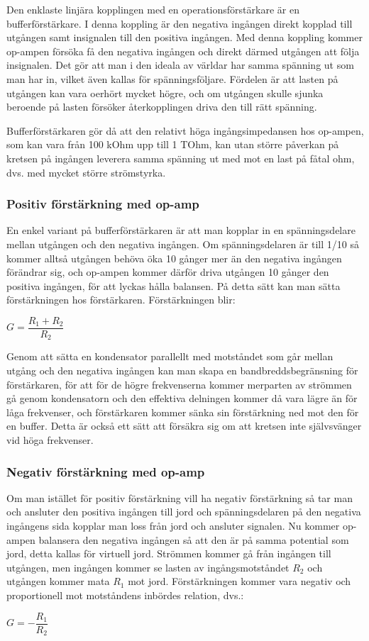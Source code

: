 Den enklaste linjära kopplingen med en operationsförstärkare är en
bufferförstärkare.
I denna koppling är den negativa ingången direkt kopplad till utgången
samt insignalen till den positiva ingången.
Med denna koppling kommer op-ampen försöka få den negativa ingången och direkt
därmed utgången att följa insignalen.
Det gör att man i den ideala av världar har samma spänning ut som man har in,
vilket även kallas för spänningsföljare.
Fördelen är att lasten på utgången kan vara oerhört mycket högre, och
om utgången skulle sjunka beroende på lasten försöker återkopplingen driva den
till rätt spänning.

Bufferförstärkaren gör då att den relativt höga ingångsimpedansen hos op-ampen,
som kan vara från 100 kOhm upp till 1 TOhm, kan utan större påverkan på
kretsen på ingången leverera samma spänning ut med mot en last på fåtal ohm,
dvs. med mycket större strömstyrka.

\subsubsection{Positiv förstärkning med op-amp}

En enkel variant på bufferförstärkaren är att man kopplar in en spänningsdelare
mellan utgången och den negativa ingången. Om spänningsdelaren är till 1/10
så kommer alltså utgången behöva öka 10 gånger mer än den negativa ingången
förändrar sig, och op-ampen kommer därför driva utgången 10 gånger den
positiva ingången, för att lyckas hålla balansen. På detta sätt kan man sätta
förstärkningen hos förstärkaren. Förstärkningen blir:

\(G = \dfrac{R_1+R_2}{R_2}\)

Genom att sätta en kondensator parallellt med motståndet som går mellan utgång
och den negativa ingången kan man skapa en bandbreddsbegränsning för
förstärkaren, för att för de högre frekvenserna kommer merparten av strömmen
gå genom kondensatorn och den effektiva delningen kommer då vara lägre än för
låga frekvenser, och förstärkaren kommer sänka sin förstärkning ned mot den
för en buffer.
Detta är också ett sätt att försäkra sig om att kretsen inte självsvänger vid
höga frekvenser.

\subsubsection{Negativ förstärkning med op-amp}

Om man istället för positiv förstärkning vill ha negativ förstärkning så tar
man och ansluter den positiva ingången till jord och spänningsdelaren på den
negativa ingångens sida kopplar man loss från jord och ansluter signalen.
Nu kommer op-ampen balansera den negativa ingången så att den är på samma
potential som jord, detta kallas för virtuell jord. Strömmen kommer gå från
ingången till utgången, men ingången kommer se lasten av ingångsmotståndet
\(R_2\) och utgången kommer mata \(R_1\) mot jord. Förstärkningen kommer vara
negativ och proportionell mot motståndens inbördes relation, dvs.:

\(G = -\dfrac{R_1}{R_2}\)

